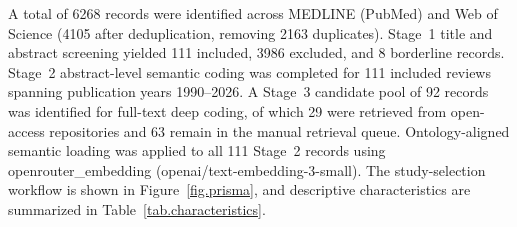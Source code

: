 A total of 6268 records were identified across MEDLINE (PubMed) and Web of Science (4105 after deduplication, removing 2163 duplicates). Stage~1 title and abstract screening yielded 111 included, 3986 excluded, and 8 borderline records. Stage~2 abstract-level semantic coding was completed for 111 included reviews spanning publication years 1990--2026. A Stage~3 candidate pool of 92 records was identified for full-text deep coding, of which 29 were retrieved from open-access repositories and 63 remain in the manual retrieval queue. Ontology-aligned semantic loading was applied to all 111 Stage~2 records using openrouter\_embedding (openai/text-embedding-3-small). The study-selection workflow is shown in Figure~\ref{fig.prisma}, and descriptive characteristics are summarized in Table~\ref{tab.characteristics}.
